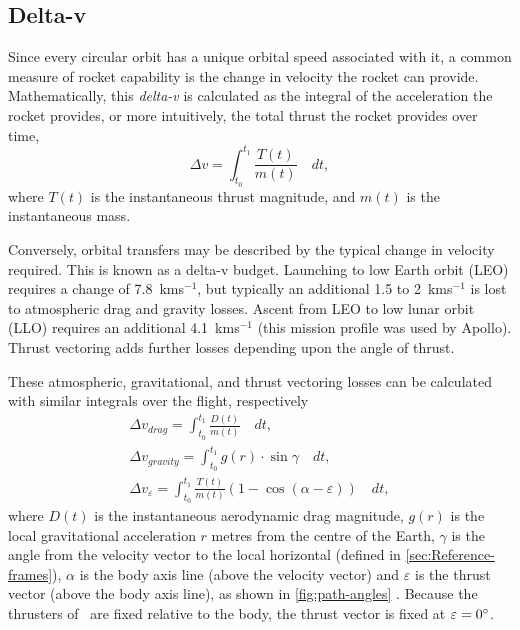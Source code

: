 \subsection{Delta-v} \label{sub:Delta-v}

Since every circular orbit has a unique orbital speed associated with it, a common measure of rocket capability is the change in velocity the rocket can provide. Mathematically, this \emph{delta-v} is calculated as the integral of the acceleration the rocket provides, or more intuitively, the total thrust the rocket provides over time,
\begin{equation}\label{eq:Delta-V}
\Delta v=\int_{t_{0}}^{t_{1}}\frac{T(t)}{m(t)}\quad dt,
\end{equation}
where $T(t)$ is the instantaneous thrust magnitude, and $m(t)$ is the instantaneous mass.

Conversely, orbital transfers may be described by the typical change in velocity required. This is known as a delta-v budget. Launching to low Earth orbit (LEO) requires a change of 7.8~kms$^{-1}$, but typically an additional 1.5 to 2~kms$^{-1}$ is lost to atmospheric drag and gravity losses. Ascent from LEO to low lunar orbit (LLO) requires an additional 4.1~kms$^{-1}$ (this mission profile was used by Apollo). Thrust vectoring adds further losses depending upon the angle of thrust. 

These atmospheric, gravitational, and thrust vectoring losses can be calculated with similar integrals over the flight, respectively
\begin{subequations} \label{eq:Delta-Vs}
\begin{gather}
\Delta v_{drag}=\int_{t_0}^{t_1}\frac{D(t)}{m(t)}\quad dt \label{eq:drag-penalty}, \\
\Delta v_{gravity}=\int_{t_0}^{t_1}g(r)\cdot\sin\gamma\quad dt \label{eq:gravity-penalty}, \\
\Delta v_\varepsilon=\int_{t_0}^{t_1}\frac{T(t)}{m(t)}(1-\cos(\alpha-\varepsilon))\quad dt \label{eq:thrust-vectoring-penalty},
\end{gather}
\end{subequations}
where $D(t)$ is the instantaneous aerodynamic drag magnitude, $g(r)$ is the local gravitational acceleration $r$ metres from the centre of the Earth, $\gamma$ is the angle from the velocity vector to the local horizontal (defined in \autoref{sec:Reference-frames}), $\alpha$ is the body axis line (above the velocity vector) and $\varepsilon$ is the thrust vector (above the body axis line), as shown in \autoref{fig:path-angles} \parencite{Tetlow2003}. Because the thrusters of \BW\ are fixed relative to the body, the thrust vector is fixed at $\varepsilon=0^\circ$.

